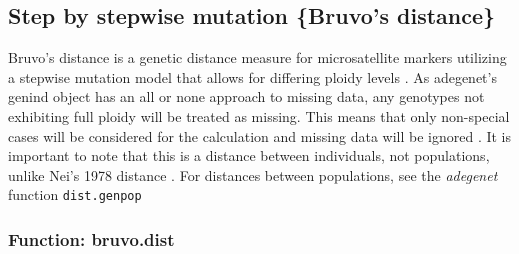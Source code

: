 \documentclass[letterpaper]{article}
\newcommand{\tab}{\hspace*{1em}}
\begin{document}
\subsection{Step by stepwise mutation \{Bruvo's distance\}}\label{index:bruvo}

\tab\tab Bruvo's distance is a genetic distance measure for microsatellite markers utilizing a stepwise mutation model that allows for differing ploidy levels \cite{Bruvo:2004}. As adegenet's genind object has an all or none approach to missing data, any genotypes not exhibiting full ploidy will be treated as missing. This means that only non-special cases will be considered for the calculation and missing data will be ignored \cite{Bruvo:2004}.  It is important to note that this is a distance between individuals, not populations, unlike Nei's 1978 distance \cite{Nei:1978}. For distances between populations, see the \textit{adegenet} function \texttt{dist.genpop}

\subsubsection{Function: bruvo.dist}\label{index:bruvo:bruvo.dist}
\end{document}
